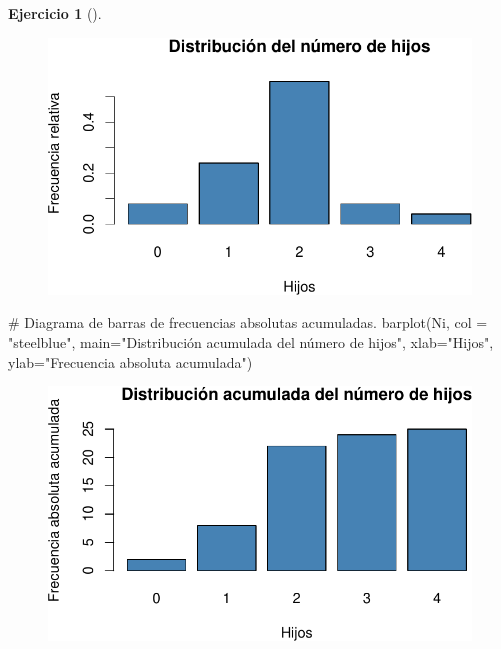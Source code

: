 \documentclass[
  a4paper,
]{scrreport}
\newenvironment{Shaded}{\begin{snugshade}}{\end{snugshade}}
\newcommand{\AttributeTok}[1]{\textcolor[rgb]{0.40,0.45,0.13}{#1}}
\newcommand{\CommentTok}[1]{\textcolor[rgb]{0.37,0.37,0.37}{#1}}
\newcommand{\FunctionTok}[1]{\textcolor[rgb]{0.28,0.35,0.67}{#1}}
\newcommand{\NormalTok}[1]{\textcolor[rgb]{0.00,0.23,0.31}{#1}}
\newcommand{\StringTok}[1]{\textcolor[rgb]{0.13,0.47,0.30}{#1}}
\theoremstyle{definition}
\newtheorem{exercise}{Ejercicio}[chapter]
\theoremstyle{remark}
\begin{document}
\begin{exercise}[]
\begin{enumerate}
\begin{tcolorbox}
\begin{figure}[H]
  {\centering \includegraphics{03-frecuencias-graficos_files/figure-pdf/unnamed-chunk-6-2.pdf}

  }

  \end{figure}

\begin{Shaded}
\begin{Highlighting}[]
\CommentTok{\# Diagrama de barras de frecuencias absolutas acumuladas.}
\FunctionTok{barplot}\NormalTok{(Ni, }\AttributeTok{col =} \StringTok{"steelblue"}\NormalTok{, }\AttributeTok{main=}\StringTok{"Distribución acumulada del número de hijos"}\NormalTok{, }\AttributeTok{xlab=}\StringTok{"Hijos"}\NormalTok{, }\AttributeTok{ylab=}\StringTok{"Frecuencia absoluta acumulada"}\NormalTok{)}
\end{Highlighting}
\end{Shaded}

  \begin{figure}[H]

  {\centering \includegraphics{03-frecuencias-graficos_files/figure-pdf/unnamed-chunk-6-3.pdf}

}
\end{figure}
\end{tcolorbox}
\end{enumerate}
\end{exercise}
\end{document}

